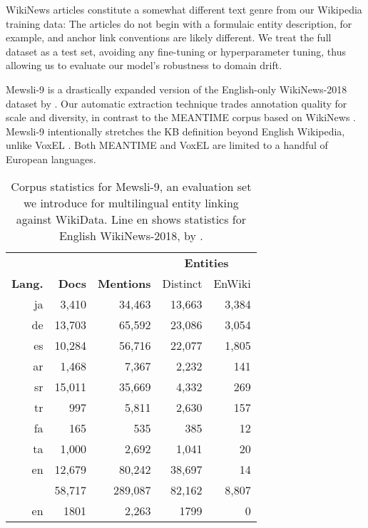 \documentclass[11pt,a4paper]{article}
\begin{document}
WikiNews articles constitute a somewhat different text genre from our Wikipedia training data: The articles do not begin with a formulaic entity description, for example, and anchor link conventions are likely different. We treat the full dataset as a test set, avoiding any fine-tuning or hyperparameter tuning, thus allowing us to evaluate our model’s robustness to domain drift.

\mbox{Mewsli-9} is a drastically expanded version of the English-only WikiNews-2018 dataset by .
Our automatic extraction technique trades annotation quality for scale and diversity, in contrast to the MEANTIME corpus based on WikiNews \cite{minard-etal-2016-meantime}.
\mbox{Mewsli-9} intentionally stretches the KB definition beyond English Wikipedia, unlike VoxEL \cite{rosales2018voxel}.
Both MEANTIME and VoxEL are limited to a handful of European languages.


\begin{table}
\small
\centering
\begin{tabular}{rrrrr} \toprule
& & & \multicolumn{2}{c}{\textbf{Entities}} \\ \cmidrule(lr){4-5}
\textbf{Lang.} & \textbf{Docs} & \textbf{Mentions} & Distinct &  EnWiki \\ \midrule
ja & 3,410 & 34,463 & 13,663 & 3,384 \\
de & 13,703 & 65,592 & 23,086 & 3,054 \\
es & 10,284 & 56,716 & 22,077 & 1,805 \\
ar & 1,468 & 7,367 & 2,232 & 141 \\
sr & 15,011 & 35,669 & 4,332 & 269 \\
tr & 997 & 5,811 & 2,630 & 157 \\
fa & 165 & 535 & 385 & 12 \\
ta & 1,000 & 2,692 & 1,041 & 20 \\
en & 12,679 & 80,242 & 38,697 & 14 \\ \cmidrule(lr){2-5} 
   & 58,717 & 289,087 & 82,162 & 8,807 \\ \midrule 
en  & 1801 & 2,263 & 1799 & 0  \\ \bottomrule
\end{tabular}
\caption{Corpus statistics for Mewsli-9, an evaluation set we introduce for multilingual entity linking against WikiData.
Line en shows statistics for English WikiNews-2018, by .
\label{tab:wn_corpus}}
\end{table}
\end{document}
